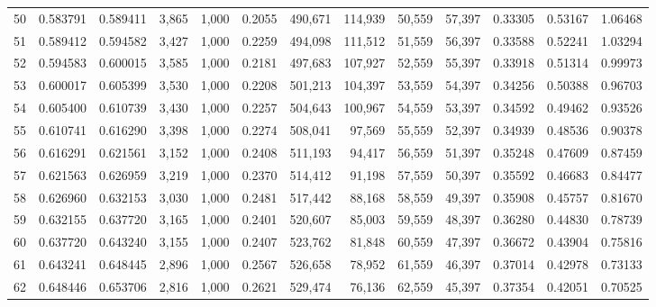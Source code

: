 \begin{tabular}{rrrrrrrrrrrrr}
50  &  0.583791 &  0.589411 &   3,865 &  1,000 &                                     0.2055 &  490,671 &  114,939 &   50,559 &   57,397 &  0.33305 &  0.53167 &  1.06468 \\
51  &  0.589412 &  0.594582 &   3,427 &  1,000 &                                     0.2259 &  494,098 &  111,512 &   51,559 &   56,397 &  0.33588 &  0.52241 &  1.03294 \\
52  &  0.594583 &  0.600015 &   3,585 &  1,000 &                                     0.2181 &  497,683 &  107,927 &   52,559 &   55,397 &  0.33918 &  0.51314 &  0.99973 \\
53  &  0.600017 &  0.605399 &   3,530 &  1,000 &                                     0.2208 &  501,213 &  104,397 &   53,559 &   54,397 &  0.34256 &  0.50388 &  0.96703 \\
54  &  0.605400 &  0.610739 &   3,430 &  1,000 &                                     0.2257 &  504,643 &  100,967 &   54,559 &   53,397 &  0.34592 &  0.49462 &  0.93526 \\
55  &  0.610741 &  0.616290 &   3,398 &  1,000 &                                     0.2274 &  508,041 &   97,569 &   55,559 &   52,397 &  0.34939 &  0.48536 &  0.90378 \\
56  &  0.616291 &  0.621561 &   3,152 &  1,000 &                                     0.2408 &  511,193 &   94,417 &   56,559 &   51,397 &  0.35248 &  0.47609 &  0.87459 \\
57  &  0.621563 &  0.626959 &   3,219 &  1,000 &                                     0.2370 &  514,412 &   91,198 &   57,559 &   50,397 &  0.35592 &  0.46683 &  0.84477 \\
58  &  0.626960 &  0.632153 &   3,030 &  1,000 &                                     0.2481 &  517,442 &   88,168 &   58,559 &   49,397 &  0.35908 &  0.45757 &  0.81670 \\
59  &  0.632155 &  0.637720 &   3,165 &  1,000 &                                     0.2401 &  520,607 &   85,003 &   59,559 &   48,397 &  0.36280 &  0.44830 &  0.78739 \\
60  &  0.637720 &  0.643240 &   3,155 &  1,000 &                                     0.2407 &  523,762 &   81,848 &   60,559 &   47,397 &  0.36672 &  0.43904 &  0.75816 \\
61  &  0.643241 &  0.648445 &   2,896 &  1,000 &                                     0.2567 &  526,658 &   78,952 &   61,559 &   46,397 &  0.37014 &  0.42978 &  0.73133 \\
62  &  0.648446 &  0.653706 &   2,816 &  1,000 &                                     0.2621 &  529,474 &   76,136 &   62,559 &   45,397 &  0.37354 &  0.42051 &  0.70525 \\

\end{tabular}

